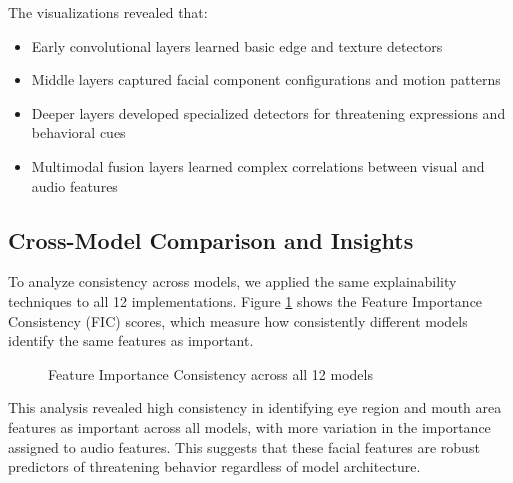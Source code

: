 \documentclass[conference,compsoc]{IEEEtran}
\begin{document}
The visualizations revealed that:
\begin{itemize}
    \item Early convolutional layers learned basic edge and texture detectors
    \item Middle layers captured facial component configurations and motion patterns
    \item Deeper layers developed specialized detectors for threatening expressions and behavioral cues
    \item Multimodal fusion layers learned complex correlations between visual and audio features
\end{itemize}

\subsection{Cross-Model Comparison and Insights}
To analyze consistency across models, we applied the same explainability techniques to all 12 implementations. Figure \ref{fig:cross_model} shows the Feature Importance Consistency (FIC) scores, which measure how consistently different models identify the same features as important.

\begin{figure}[H]
\centering
\begin{minipage}{0.85\textwidth}
\end{minipage}
\caption{Feature Importance Consistency across all 12 models}
\label{fig:cross_model}
\end{figure}

This analysis revealed high consistency in identifying eye region and mouth area features as important across all models, with more variation in the importance assigned to audio features. This suggests that these facial features are robust predictors of threatening behavior regardless of model architecture.
\end{document}

